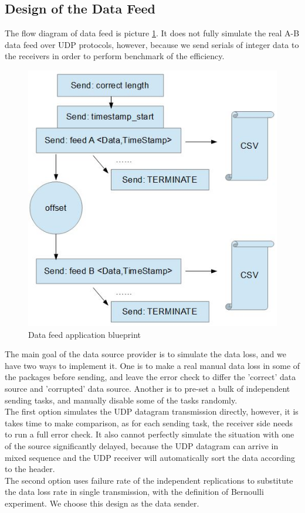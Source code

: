 \documentclass[11pt,openright,a4paper]{report}
\begin{document}
\subsection{Design of the Data Feed}
The flow diagram of data feed is picture \ref{fig:sender-diagram}. It does not fully simulate the real A-B data feed over UDP protocols, however, because we send serials of integer data to the receivers in order to perform benchmark of the efficiency. 
\begin{figure}[H]
\centering
\includegraphics[width=0.5\linewidth]{picture/sender-diagram}
\caption{Data feed application blueprint}
\label{fig:sender-diagram}
\end{figure}
The main goal of the data source provider is to simulate the data loss, and we have two ways to implement it. One is to make a real manual data loss in some of the packages before sending, and leave the error check to differ the 'correct' data source and 'corrupted' data source. Another is to pre-set a bulk of independent sending tasks, and manually disable some of the tasks randomly.\\
The first option simulates the UDP datagram transmission directly, however, it is takes time to make comparison, as for each sending task, the receiver side needs to run a full error check. It also cannot perfectly simulate the situation with one of the source significantly delayed, because the UDP datagram can arrive in mixed sequence and the UDP receiver will automatically sort the data according to the header.\\
The second option uses failure rate of the independent replications to substitute the data loss rate in single transmission, with the definition of Bernoulli experiment\cite{anderberg2014cluster}. We choose this design as the data sender.\\
\end{document}
